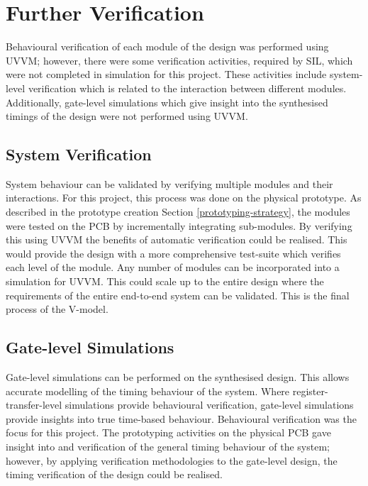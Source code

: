 \section{Further Verification}
Behavioural verification of each module of the design was performed using UVVM; however, there were some verification activities, required by SIL, which were not completed in simulation for this project. These activities include system-level verification which is related to the interaction between different modules. Additionally, gate-level simulations which give insight into the synthesised timings of the design were not performed using UVVM.

\subsection{System Verification}

System behaviour can be validated by verifying multiple modules and their interactions. For this project, this process was done on the physical prototype. As described in the prototype creation Section \ref{prototyping-strategy}, the modules were tested on the PCB by incrementally integrating sub-modules. By verifying this using UVVM the benefits of automatic verification could be realised. This would provide the design with a more comprehensive test-suite which verifies each level of the module. Any number of modules can be incorporated into a simulation for UVVM. This could scale up to the entire design where the requirements of the entire end-to-end system can be validated. This is the final process of the V-model. 

\subsection{Gate-level Simulations}

Gate-level simulations can be performed on the synthesised design. This allows accurate modelling of the timing behaviour of the system. Where register-transfer-level simulations provide behavioural verification, gate-level simulations provide insights into true time-based behaviour. Behavioural verification was the focus for this project. The prototyping activities on the physical PCB gave insight into and verification of the general timing behaviour of the system; however, by applying verification methodologies to the gate-level design, the timing verification of the design could be realised. 



